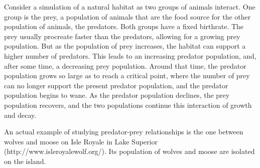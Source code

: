 Consider a simulation of a natural habitat as two groups of animals interact. One group is the prey, a population of animals that are the food source for the other population of animals, the predators. Both groups have a fixed birthrate. The prey usually procreate faster than the predators, allowing for a growing prey population. But as the population of prey increases, the habitat can support a higher number of predators. This leads to an increasing predator population, and, after some time, a decreasing prey population. Around that time, the predator population grows so large as to reach a critical point, where the number of prey can no longer support the present predator population, and the predator population begins to wane. As the predator population declines, the prey population recovers, and the two populations continue this interaction of growth and decay.

An actual example of studying predator-prey relationships is the one between wolves and moose on Isle Royale in Lake Superior (http://www.isleroyalewolf.org/). Its population of wolves and moose are isolated on the island.
